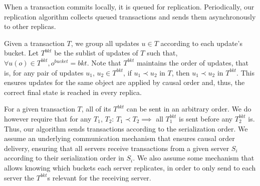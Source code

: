 \documentclass{vldb}
\begin{document}

When a transaction commits locally, it is queued for replication.
Periodically, our replication algorithm collects queued transactions and sends them asynchronously to other replicas.

Given a transaction $T$, we group all updates $u \in T$ according to each update's bucket.
Let $T^{bkt}$ be the sublist of updates of $T$ such that, $\forall u(o) \in T^{bkt}, o^{bucket} = bkt$.
Note that $T^{bkt}$ maintains the order of updates, that is, for any pair of updates $u_1$, $u_2 \in T^{bkt}$, if $u_1 \prec u_2$ in $T$, then $u_1 \prec u_2$ in $T^{bkt}$.
This ensures updates for the same object are applied by causal order and, thus, the correct final state is reached in every replica.

For a given transaction $T$, all of its $T^{bkt}$ can be sent in an arbitrary order.
We do however require that for any $T_1$, $T_2$: $T_1 \prec T_2 \implies$ all $T_1^{bkt}$ is sent before any $T_2^{bkt}$ is.
Thus, our algorithm sends transactions according to the serialization order.
We assume an underlying communication mechanism that ensures causal order delivery, ensuring that all servers receive transactions from a given server $S_i$ according to their serialization order in $S_i$.
We also assume some mechanism that allows knowing which buckets each server replicates, in order to only send to each server the $T^{bkt}$s relevant for the receiving server.
\end{document}
